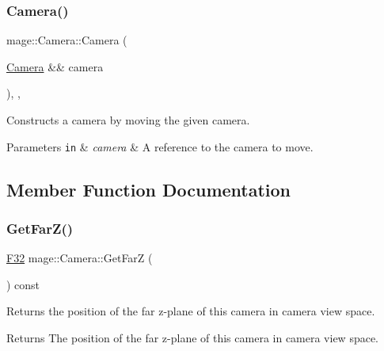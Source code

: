 \subsubsection{\texorpdfstring{Camera()}{Camera()}\hspace{0.1cm}{\footnotesize\ttfamily [3/3]}}
{\footnotesize\ttfamily mage\+::\+Camera\+::\+Camera (\begin{DoxyParamCaption}\item[{\hyperlink{classmage_1_1_camera}{Camera} \&\&}]{camera }\end{DoxyParamCaption})\hspace{0.3cm}{\ttfamily [protected]}, {\ttfamily [default]}, {\ttfamily [noexcept]}}

Constructs a camera by moving the given camera.


\begin{DoxyParams}[1]{Parameters}
\mbox{\tt in}  & {\em camera} & A reference to the camera to move. \\
\hline
\end{DoxyParams}


\subsection{Member Function Documentation}
\hypertarget{classmage_1_1_camera_a47e6801d228891453540b0c1e787724a}{}\label{classmage_1_1_camera_a47e6801d228891453540b0c1e787724a} 
\subsubsection{\texorpdfstring{Get\+Far\+Z()}{GetFarZ()}}
{\footnotesize\ttfamily \hyperlink{namespacemage_aa97e833b45f06d60a0a9c4fc22ae02c0}{F32} mage\+::\+Camera\+::\+Get\+FarZ (\begin{DoxyParamCaption}{ }\end{DoxyParamCaption}) const\hspace{0.3cm}{\ttfamily [noexcept]}}

Returns the position of the far z-\/plane of this camera in camera view space.

\begin{DoxyReturn}{Returns}
The position of the far z-\/plane of this camera in camera view space. 
\end{DoxyReturn}
\hypertarget{classmage_1_1_camera_ac9c78f262c8cea00c8887afe39625249}{}\label{classmage_1_1_camera_ac9c78f262c8cea00c8887afe39625249} 
